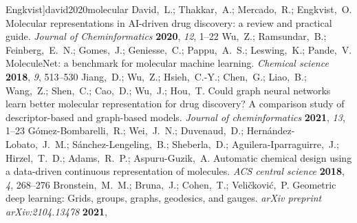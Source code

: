 \documentclass[journal=jcisd8,manuscript=article]{achemso} %
\begin{document}
\begin{mcitethebibliography}{34}
  Engkvist]{david2020molecular}
David,~L.; Thakkar,~A.; Mercado,~R.; Engkvist,~O. Molecular representations in
  AI-driven drug discovery: a review and practical guide. \emph{Journal of
  Cheminformatics} \textbf{2020}, \emph{12}, 1--22\relax
\mciteBstWouldAddEndPuncttrue
\mciteSetBstMidEndSepPunct{\mcitedefaultmidpunct}
{\mcitedefaultendpunct}{\mcitedefaultseppunct}\relax
\EndOfBibitem
{}
Wu,~Z.; Ramsundar,~B.; Feinberg,~E.~N.; Gomes,~J.; Geniesse,~C.; Pappu,~A.~S.;
  Leswing,~K.; Pande,~V. MoleculeNet: a benchmark for molecular machine
  learning. \emph{Chemical science} \textbf{2018}, \emph{9}, 513--530\relax
\mciteBstWouldAddEndPuncttrue
\mciteSetBstMidEndSepPunct{\mcitedefaultmidpunct}
{\mcitedefaultendpunct}{\mcitedefaultseppunct}\relax
\EndOfBibitem
{}
Jiang,~D.; Wu,~Z.; Hsieh,~C.-Y.; Chen,~G.; Liao,~B.; Wang,~Z.; Shen,~C.;
  Cao,~D.; Wu,~J.; Hou,~T. Could graph neural networks learn better molecular
  representation for drug discovery? A comparison study of descriptor-based and
  graph-based models. \emph{Journal of cheminformatics} \textbf{2021},
  \emph{13}, 1--23\relax
\mciteBstWouldAddEndPuncttrue
\mciteSetBstMidEndSepPunct{\mcitedefaultmidpunct}
{\mcitedefaultendpunct}{\mcitedefaultseppunct}\relax
\EndOfBibitem
{}
G{\'o}mez-Bombarelli,~R.; Wei,~J.~N.; Duvenaud,~D.;
  Hern{\'a}ndez-Lobato,~J.~M.; S{\'a}nchez-Lengeling,~B.; Sheberla,~D.;
  Aguilera-Iparraguirre,~J.; Hirzel,~T.~D.; Adams,~R.~P.; Aspuru-Guzik,~A.
  Automatic chemical design using a data-driven continuous representation of
  molecules. \emph{ACS central science} \textbf{2018}, \emph{4}, 268--276\relax
\mciteBstWouldAddEndPuncttrue
\mciteSetBstMidEndSepPunct{\mcitedefaultmidpunct}
{\mcitedefaultendpunct}{\mcitedefaultseppunct}\relax
\EndOfBibitem
{}
Bronstein,~M.~M.; Bruna,~J.; Cohen,~T.; Veli{\v{c}}kovi{\'c},~P. Geometric deep
  learning: Grids, groups, graphs, geodesics, and gauges. \emph{arXiv preprint
  arXiv:2104.13478} \textbf{2021}, \relax
\mciteBstWouldAddEndPunctfalse
\mciteSetBstMidEndSepPunct{\mcitedefaultmidpunct}
{}{\mcitedefaultseppunct}\relax

\end{mcitethebibliography}
\end{document}
